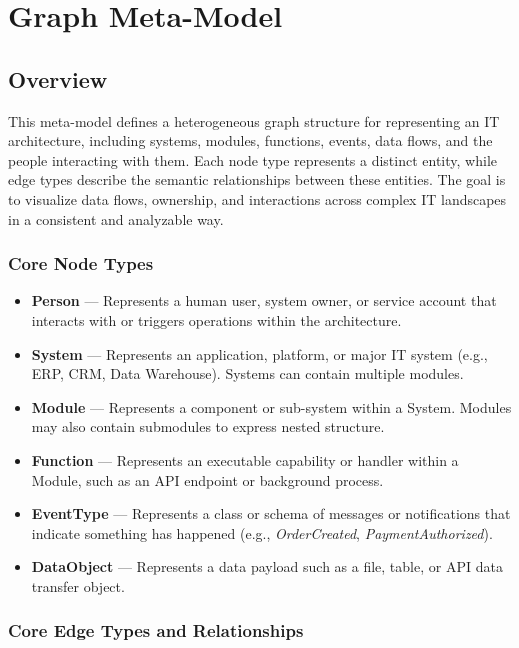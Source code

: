\chapter{Graph Meta-Model}
\section{Overview}

This meta-model defines a heterogeneous graph structure for representing an IT architecture, including systems, modules, functions, events, data flows, and the people interacting with them. Each node type represents a distinct entity, while edge types describe the semantic relationships between these entities. The goal is to visualize data flows, ownership, and interactions across complex IT landscapes in a consistent and analyzable way.

\subsection{Core Node Types}

\begin{itemize}
    \item \textbf{Person} --- Represents a human user, system owner, or service account that interacts with or triggers operations within the architecture.
    \item \textbf{System} --- Represents an application, platform, or major IT system (e.g., ERP, CRM, Data Warehouse). Systems can contain multiple modules.
    \item \textbf{Module} --- Represents a component or sub-system within a System. Modules may also contain submodules to express nested structure.
    \item \textbf{Function} --- Represents an executable capability or handler within a Module, such as an API endpoint or background process.
    \item \textbf{EventType} --- Represents a class or schema of messages or notifications that indicate something has happened (e.g., \emph{OrderCreated}, \emph{PaymentAuthorized}).
    \item \textbf{DataObject} --- Represents a data payload such as a file, table, or API data transfer object.
\end{itemize}

\subsection{Core Edge Types and Relationships}

